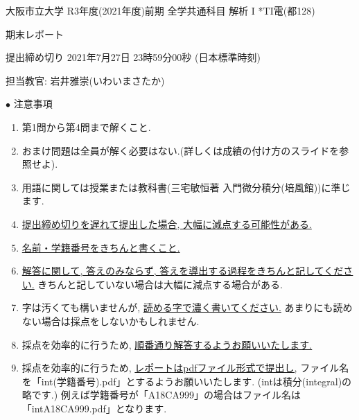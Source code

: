 \documentclass[dvipdfmx,a4paper,11pt]{article}
\theoremstyle{definition}
\begin{document}
\begin{center}
{ \large 大阪市立大学 R3年度(2021年度)前期 全学共通科目 解析 I *TI電(都128)} \\
\vspace{5pt}


{\LARGE 期末レポート } \\
\vspace{5pt}

{ \Large 提出締め切り 2021年7月27日 23時59分00秒 (日本標準時刻)}
\end{center}

\begin{flushright}
 担当教官: 岩井雅崇(いわいまさたか) 
\end{flushright}

{\Large $\bullet$ 注意事項}
\begin{enumerate}
\item 第1問から第4問まで解くこと. 
\item おまけ問題は全員が解く必要はない.(詳しくは成績の付け方のスライドを参照せよ).
\item 用語に関しては授業または教科書(三宅敏恒著 入門微分積分(培風館))に準じます.
\item \underline{提出締め切りを遅れて提出した場合, 大幅に減点する可能性がある.}
\item \underline{名前・学籍番号をきちんと書くこと.}
\item \underline{解答に関して, 答えのみならず, 答えを導出する過程をきちんと記してください.} きちんと記していない場合は大幅に減点する場合がある.
\item 字は汚くても構いませんが, \underline{読める字で濃く書いてください.} あまりにも読めない場合は採点をしないかもしれません.%
\item 採点を効率的に行うため, \underline{順番通り解答するようお願いいたします.}
\item 採点を効率的に行うため,  \underline{レポートはpdfファイル形式で提出し,} ファイル名を「int(学籍番号).pdf」とするようお願いいたします. 
(intは積分(integral)の略です.)
例えば学籍番号が「A18CA999」の場合はファイル名は「intA18CA999.pdf」となります.
\end{enumerate}
\end{document}
